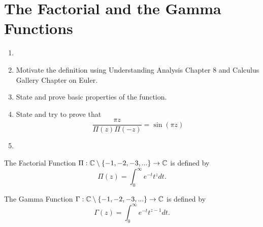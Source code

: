 \chapter{The Factorial and the Gamma Functions}

\begin{enumerate}
    \item \td
    \item Motivate the definition using Understanding Analysis Chapter 8 and Calculus Gallery Chapter on Euler.
    \item State and prove basic properties of the function.
    \item State and try to prove that
    $$\frac{\pi z}{\Pi(z)\Pi(-z)} = \sin(\pi z)$$
    \item \td
\end{enumerate}

\begin{definition}
    The Factorial Function $\Pi : \mathbb{C} \setminus \{-1, -2, -3, ...\} \to \mathbb{C}$ is defined by
    $$\Pi(z) = \int_{0}^{\infty}e^{-t}t^z dt.$$
\end{definition}

\begin{definition}
    The Gamma Function $\Gamma : \mathbb{C} \setminus \{-1, -2, -3, ...\} \to \mathbb{C}$ is defined by
    $$\Gamma(z) = \int_{0}^{\infty}e^{-t}t^{z-1}dt.$$
\end{definition}